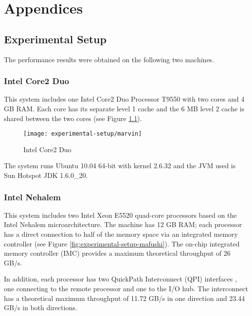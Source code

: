 
\part{Appendices}
\label{part:appendices}

\chapter{Experimental Setup}
\label{chap:experimental-setup}

The performance results were obtained on the following two machines.

\section{Intel Core2 Duo}
\label{sec:experimental-setup-marvin}

This system includes one Intel Core2 Duo Processor T9550 with two
cores and 4 GB RAM. Each core has its separate level 1 cache and the 6
MB level 2 cache is shared between the two cores (see Figure
\ref{fig:experimental-setup-marvin}).

\begin{figure}[htb]
  \centering
  \texttt{[image: experimental-setup/marvin]}
  \caption[Intel Core2 Duo]{Intel Core2 Duo}
  \label{fig:experimental-setup-marvin}
\end{figure}

The system runs Ubuntu 10.04 64-bit with kernel 2.6.32 and the JVM
used is Sun Hotspot JDK 1.6.0\_20.

\section{Intel Nehalem}
\label{sec:experimental-setup-mafushi}

This system includes two Intel Xeon E5520 quad-core processors based
on the Intel Nehalem microarchitecture. The machine has 12 GB RAM;
each processor has a direct connection to half of the memory space via
an integrated memory controller (see Figure
\ref{fig:experimental-setup-mafushi}). The on-chip integrated memory
controller (IMC) provides a maximum theoretical throughput of 26 GB/s.

In addition, each processor has two QuickPath Interconnect (QPI)
interfaces \cite{Maddox2009}, one connecting to the remote processor
and one to the I/O hub. The interconnect has a theoretical maximum
throughput of 11.72 GB/s in one direction and 23.44 GB/s in both
directions.

